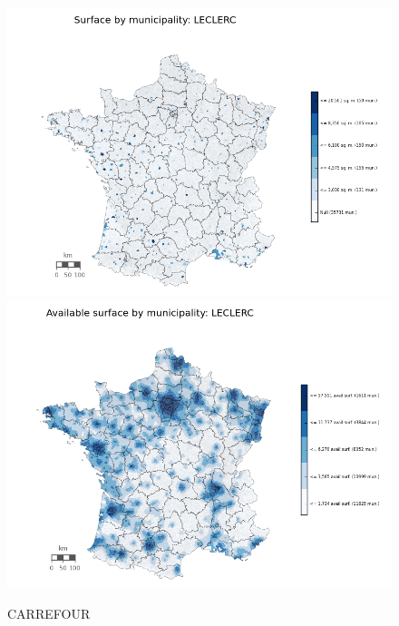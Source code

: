 \documentclass[11pt]{article}
\begin{document}
\begin{figure}[H]
    \caption{CARREFOUR}
	\centering
		\includegraphics[width=15cm]{images/maps_surface/LECLERC.png}
        \includegraphics[width=15cm]{images/maps_available_surface/LECLERC.png}
\end{figure}
\end{document}
